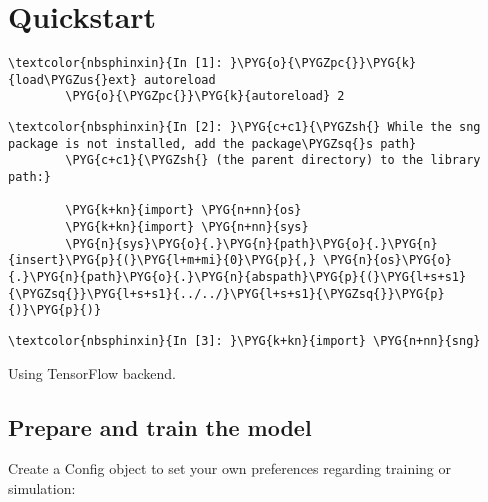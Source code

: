 \documentclass[letterpaper,10pt,english]{sphinxmanual}
\begin{document}
\chapter{Quickstart}
\label{\detokenize{notebooks/01_quickstart:Quickstart}}\label{\detokenize{notebooks/01_quickstart::doc}}
%
\begin{Verbatim}[commandchars=\\\{\}]
\textcolor{nbsphinxin}{In [1]: }\PYG{o}{\PYGZpc{}}\PYG{k}{load\PYGZus{}ext} autoreload
        \PYG{o}{\PYGZpc{}}\PYG{k}{autoreload} 2
\end{Verbatim}

%
\begin{Verbatim}[commandchars=\\\{\}]
\textcolor{nbsphinxin}{In [2]: }\PYG{c+c1}{\PYGZsh{} While the sng package is not installed, add the package\PYGZsq{}s path}
        \PYG{c+c1}{\PYGZsh{} (the parent directory) to the library path:}
        
        \PYG{k+kn}{import} \PYG{n+nn}{os}
        \PYG{k+kn}{import} \PYG{n+nn}{sys}
        \PYG{n}{sys}\PYG{o}{.}\PYG{n}{path}\PYG{o}{.}\PYG{n}{insert}\PYG{p}{(}\PYG{l+m+mi}{0}\PYG{p}{,} \PYG{n}{os}\PYG{o}{.}\PYG{n}{path}\PYG{o}{.}\PYG{n}{abspath}\PYG{p}{(}\PYG{l+s+s1}{\PYGZsq{}}\PYG{l+s+s1}{../../}\PYG{l+s+s1}{\PYGZsq{}}\PYG{p}{)}\PYG{p}{)}
\end{Verbatim}

%
\begin{Verbatim}[commandchars=\\\{\}]
\textcolor{nbsphinxin}{In [3]: }\PYG{k+kn}{import} \PYG{n+nn}{sng}
\end{Verbatim}



%
\begin{OriginalVerbatim}[commandchars=\\\{\}]
Using TensorFlow backend.
\end{OriginalVerbatim}
\relax


\section{Prepare and train the model}
\label{\detokenize{notebooks/01_quickstart:Prepare-and-train-the-model}}
Create a Config object to set your own preferences regarding training or
simulation:
\end{document}
